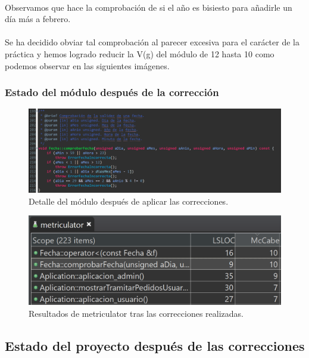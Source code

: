 	\paragraph{}Observamos que hace la comprobación de si el año es bisiesto para añadirle un día más a febrero.
	
	\paragraph{}Se ha decidido obviar tal comprobación al parecer excesiva para el carácter de la práctica y hemos logrado reducir la V(g) del módulo de 12 hasta 10 como podemos observar en las siguientes imágenes.
	
	\subsubsection{Estado del módulo después de la corrección}
	
	\begin{figure}[H]
		\centering
		\includegraphics[scale=0.9]{img/estebanFinal12.png}
		\caption{Detalle del módulo después de aplicar las correcciones.}
		\label{estebanFinal12}
	\end{figure}

	\begin{figure}[H]
		\centering
		\includegraphics[scale=0.9]{img/estebanFinal13.png}
		\caption{Resultados de metriculator tras las correcciones realizadas.}
		\label{estebanFinal13}
	\end{figure}

	\subsection{Estado del proyecto después de las correcciones}
	
